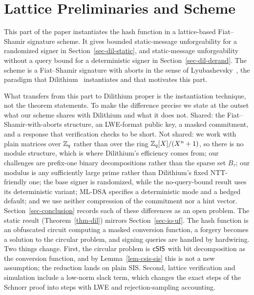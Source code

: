 \section{Lattice Preliminaries and Scheme} \label{sec-dilithium}


This part of the paper instantiates the hash function in a lattice-based Fiat--Shamir signature scheme. It gives bounded static-message unforgeability for a randomized signer in Section~\ref{sec-dil-static}, and static-message unforgeability without a query bound for a deterministic signer in Section~\ref{sec-dil-derand}. The scheme is a Fiat--Shamir signature with aborts in the sense of Lyubashevsky~\cite{AC:Lyubashevsky09,EC:Lyubashevsky12}, the paradigm that Dilithium~\cite{Dilithium} instantiates and that motivates this part.

What transfers from this part to Dilithium proper is the instantiation technique, not the theorem statements. To make the difference precise we state at the outset what our scheme shares with Dilithium and what it does not. Shared: the Fiat--Shamir-with-aborts structure, an LWE-format public key, a masked commitment, and a response that verification checks to be short. Not shared: we work with plain matrices over $\mathbb{Z}_q$ rather than over the ring $\mathbb Z_q[X]/(X^n+1)$, so there is no module structure, which is where Dilithium's efficiency comes from; our challenges are prefix-one binary decompositions rather than the sparse set $B_\tau$; our modulus is any sufficiently large prime rather than Dilithium's fixed NTT-friendly one; the base signer is randomized, while the no-query-bound result uses its deterministic variant; ML-DSA specifies a deterministic mode and a hedged default; and we use neither compression of the commitment nor a hint vector. Section~\ref{sec-conclusion} records each of these differences as an open problem. The static result (Theorem~\ref{thm-dil}) mirrors Section~\ref{sec-io-uf}. The hash function is an obfuscated circuit computing a masked conversion function, a forgery becomes a solution to the circular problem, and signing queries are handled by hardwiring. Two things change. First, the circular problem is $\mathsf{cSIS}$ with bit decomposition as the conversion function, and by Lemma~\ref{lem-csis-sis} this is not a new assumption; the reduction lands on plain SIS. Second, lattice verification and simulation include a low-norm slack term, which changes the exact steps of the Schnorr proof into steps with LWE and rejection-sampling accounting.

